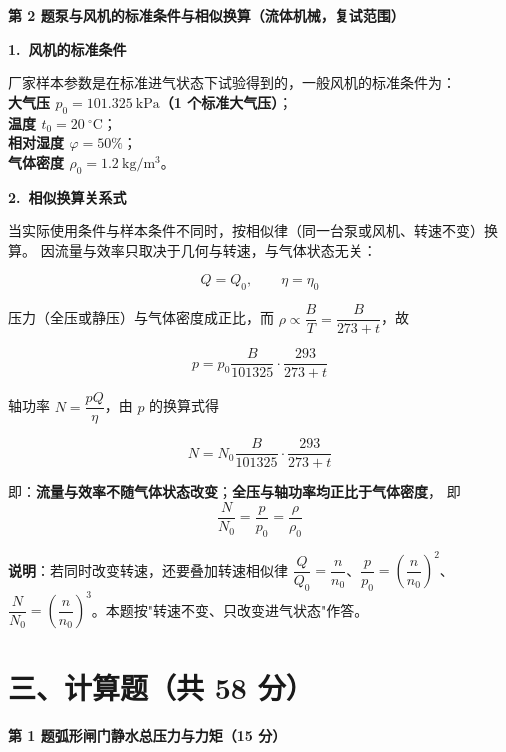 \noindent\textbf{第 2 题\quad 泵与风机的标准条件与相似换算（流体机械，复试范围）}

\begin{jie}
\textbf{1.\ 风机的标准条件}

厂家样本参数是在标准进气状态下试验得到的，一般风机的标准条件为：\\[2pt]
\textbf{大气压 $p_0=101.325\ \mathrm{kPa}$（1 个标准大气压）}；\\
\textbf{温度 $t_0=20\ ^{\circ}\mathrm{C}$}；\\
\textbf{相对湿度 $\varphi=50\%$}；\\
\textbf{气体密度 $\rho_0=1.2\ \mathrm{kg/m^3}$}。

\textbf{2.\ 相似换算关系式}

当实际使用条件与样本条件不同时，按相似律（同一台泵或风机、转速不变）换算。
因流量与效率只取决于几何与转速，与气体状态无关：

\[ Q=Q_0,\qquad \eta=\eta_0 \]

压力（全压或静压）与气体密度成正比，而 $\rho\propto\dfrac{B}{T}=\dfrac{B}{273+t}$，故

\[ p=p_0\frac{B}{101325}\cdot\frac{293}{273+t} \]

轴功率 $N=\dfrac{pQ}{\eta}$，由 $p$ 的换算式得

\[ N=N_0\frac{B}{101325}\cdot\frac{293}{273+t} \]

即：\textbf{流量与效率不随气体状态改变}；\textbf{全压与轴功率均正比于气体密度}，
即
\[ \frac{N}{N_0}=\frac{p}{p_0}=\frac{\rho}{\rho_0} \]

\textbf{说明}：若同时改变转速，还要叠加转速相似律
$\dfrac{Q}{Q_0}=\dfrac{n}{n_0}$、$\dfrac{p}{p_0}=\left(\dfrac{n}{n_0}\right)^2$、
$\dfrac{N}{N_0}=\left(\dfrac{n}{n_0}\right)^3$。本题按"转速不变、只改变进气状态"作答。
\end{jie}

\section*{三、计算题（共 58 分）}

\noindent\textbf{第 1 题\quad 弧形闸门静水总压力与力矩（15 分）}

